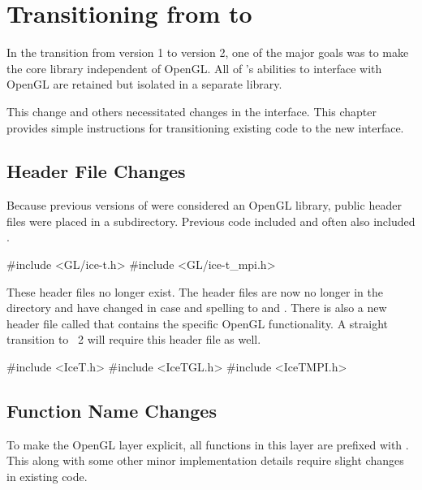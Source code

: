 

\chapter{Transitioning from  to }
\label{chap:Transitioning}

In the transition from \IceT version 1 to \IceT version 2, one of the major
goals was to make the core \IceT library independent of
OpenGL.  All of \IceT's abilities to interface with OpenGL
are retained but isolated in a separate library.

This change and others necessitated changes in the \IceT interface.  This
chapter provides simple instructions for transitioning existing code to the
new \IceT interface.

\section{Header File Changes}
\label{sec:Transitioning:Header_File_Changes}

Because previous versions of \IceT were considered an OpenGL library,
public header files were placed in a  subdirectory.  Previous
code included  and often
also included
.
\begin{code}
#include <GL/ice-t.h>
#include <GL/ice-t_mpi.h>
\end{code}

These header files no longer exist.  The header files are now no longer in
the  directory and have changed in case and spelling to
 and .  There
is also a new header file called  that
contains the specific OpenGL functionality.  A straight transition to
\IceT~2 will require this header file as well.
\begin{code}
#include <IceT.h>
#include <IceTGL.h>
#include <IceTMPI.h>
\end{code}

\section{Function Name Changes}
\label{sec:Transitioning:Function_Name_Changes}

To make the OpenGL layer explicit, all functions in this layer are prefixed
with .  This along with some other minor implementation
details require slight changes in existing code.

